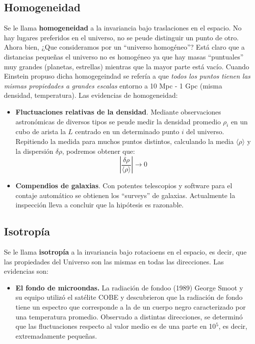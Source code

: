 \subsection{Homogeneidad}

Se le llama \textbf{homogeneidad} a la invariancia bajo traslaciones en el espacio. No hay lugares preferidos en el universo, no se peude distinguir un punto de otro. Ahora bien, ¿Que consideramos por un ``universo homogéneo''? Está claro que a distancias pequeñas el universo no es homogéneo ya que hay masas ``puntuales'' muy grandes (planetas, estrellas) mientras que la mayor parte está vacío. Cuando Einstein propuso dicha homogegeindad se refería a que \textit{todos los puntos tienen las mismas propiedades a grandes escalas} entorno a 10 Mpc - 1 Gpc (misma densidad, temperatura). Las evidencias de homogeneidad:

\begin{itemize}
	\item \textbf{Fluctuaciones relativas de la densidad}. Mediante observaciones astronómicas de diversos tipos se peude medir la densidad promedio $\rho_i$ en un cubo de arista la $L$ centrado en un determinado punto $i$ del universo. Repitiendo la medida para muchos puntos distintos, calculando la media $\langle \rho \rangle $ y la dispersión $\delta \rho$, podremos obtener que:
	      \begin{equation}
		      \left| \frac{\delta \rho}{\langle \rho \rangle} \right| \rightarrow 0
	      \end{equation}
	\item \textbf{Compendios de galaxias}. Con potentes telescopios y software para el contaje automático se obtienen los ``surveys'' de galaxias. Actualmente la inspección lleva a concluir que la hipótesis es razonable.
\end{itemize}
\subsection{Isotropía}

Se le llama \textbf{isotropía} a la invariancia bajo rotacioens en el espacio, es decir, que las propiedades del Universo son las mismas en todas las direcciones. Las evidencias son:

\begin{itemize}
	\item \textbf{El fondo de microondas.} La radiación de fondoo (1989) George Smoot y su equipo utilizó el satélite COBE y descubrieron que la radiación de fondo tiene un espectro que corresponde a la de un cuerpo negro caracterizado por una temperatura promedio. Observado a distintas direcciones, se determinó que las fluctuaciones respecto al valor medio es de una parte en 10$^5$, es decir, extremadamente pequeñas.
\end{itemize}


